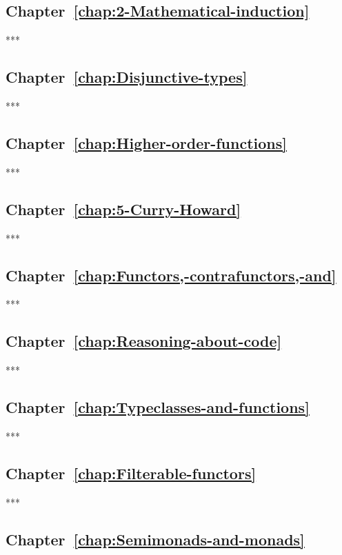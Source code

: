 \subsection{Chapter~\ref{chap:2-Mathematical-induction}}

{*}{*}{*}

\subsection{Chapter~\ref{chap:Disjunctive-types}}

{*}{*}{*}

\subsection{Chapter~\ref{chap:Higher-order-functions}}

{*}{*}{*}

\subsection{Chapter~\ref{chap:5-Curry-Howard}}

{*}{*}{*}

\subsection{Chapter~\ref{chap:Functors,-contrafunctors,-and}}

{*}{*}{*}

\subsection{Chapter~\ref{chap:Reasoning-about-code}}

{*}{*}{*}

\subsection{Chapter~\ref{chap:Typeclasses-and-functions}}

{*}{*}{*}

\subsection{Chapter~\ref{chap:Filterable-functors}}

{*}{*}{*}

\subsection{Chapter~\ref{chap:Semimonads-and-monads}}

